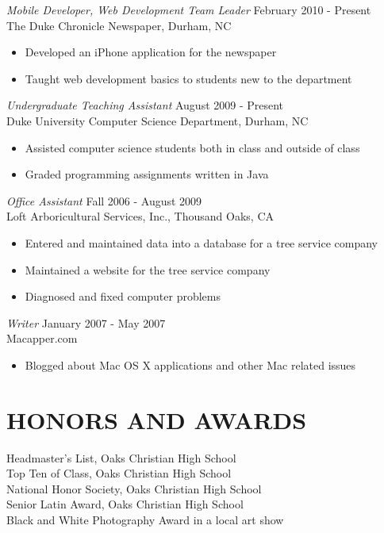 \documentclass[line,margin]{res}
\begin{document}
\begin{resume}
	{\sl Mobile Developer, Web Development Team Leader} \hfill February 2010 - Present \\
                The Duke Chronicle Newspaper, Durham, NC
                 \begin{itemize}  \itemsep -2pt %
                 \item Developed an iPhone application for the newspaper
				 \item Taught web development basics to students new to the department
                \end{itemize}

				{\sl Undergraduate Teaching Assistant} \hfill August 2009 - Present \\
                Duke University Computer Science Department, 
                Durham, NC
                 \begin{itemize}  \itemsep -2pt %
                 \item Assisted computer science students both in class and outside of class
				 \item Graded programming assignments written in Java
                \end{itemize}
 
                {\sl Office Assistant} \hfill            Fall 2006 - August 2009 \\
                Loft Arboricultural Services, Inc., Thousand Oaks, CA 
                 \begin{itemize}  \itemsep -2pt %
                 \item Entered and maintained data into a database for a tree service company
				 \item Maintained a website for the tree service company
 				 \item Diagnosed and fixed computer problems
                 \end{itemize} 
				{\sl Writer} \hfill        January 2007 - May 2007 \\
                Macapper.com
                  \begin{itemize}
                   \item Blogged about Mac OS X applications and other Mac related issues
                   \end{itemize}
                

\section{HONORS AND AWARDS}
	Headmaster's List, Oaks Christian High School \\
	Top Ten of Class, Oaks Christian High School \\
	National Honor Society, Oaks Christian High School \\
	Senior Latin Award, Oaks Christian High School \\
	Black and White Photography Award in a local art show


\end{resume}
\end{document}
